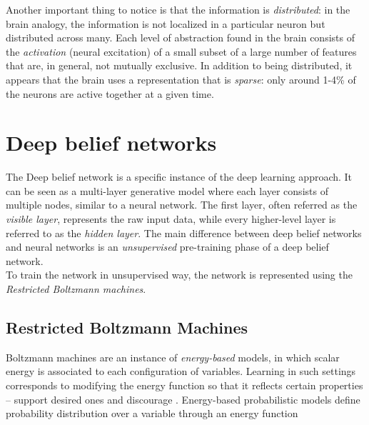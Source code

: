 Another important thing to notice is that the information is \textit{distributed}: in the brain analogy, the information is not localized in a particular neuron but distributed across many. Each level of abstraction found in the brain consists of the \textit{activation} (neural excitation) of a small subset of a large number of features that are, in general, not mutually exclusive. In addition to being distributed, it appears that the brain uses a representation that is \textit{sparse}: only around 1-4\% of the neurons are active together at a given time.


\section{Deep belief networks}

The Deep belief network is a specific instance of the deep learning approach. It can be seen as a multi-layer generative model where each layer consists of multiple nodes, similar to a neural network. The first layer, often referred as the \textit{visible layer}, represents the raw input data, while every higher-level layer is referred to as the \textit{hidden layer}. The main difference between deep belief networks and neural networks is an \textit{unsupervised} pre-training phase of a deep belief network. \\

To train the network in unsupervised way, the network is represented using the \textit{Restricted Boltzmann machines}.





\subsection{Restricted Boltzmann Machines}

Boltzmann machines are an instance of \textit{energy-based} models, in which  scalar energy is associated  to each configuration of variables. Learning in such settings corresponds to modifying the energy function so that it reflects certain properties -- support desired ones and discourage . Energy-based probabilistic models define  probability distribution over a variable through an energy function

